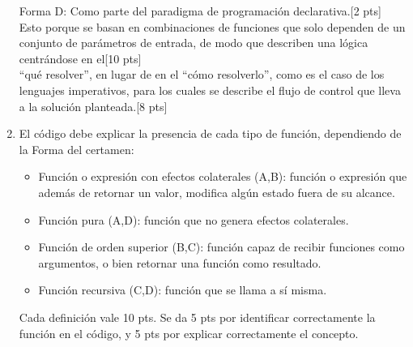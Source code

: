 \documentclass[letter,12pt,oneside]{book}
\theoremstyle{definition}
\begin{document}
\begin{enumerate}
    Forma D:
    Como parte del paradigma de programación declarativa.\tabto{82ex}[2 pts]\\
    Esto porque se basan en combinaciones de funciones que solo dependen de un conjunto de parámetros de entrada, de modo que describen una lógica centrándose en el\tabto{81ex}[10 pts]\\
    ``qué resolver'', en lugar de en el ``cómo resolverlo'', como es el caso de los lenguajes imperativos, para los cuales se describe el flujo de control que lleva a la solución planteada.\tabto{82ex}[8 pts]
    
    \item El código debe explicar la presencia de cada tipo de función, dependiendo de la Forma del certamen:
    \begin{itemize}
        \item Función o expresión con efectos colaterales (A,B): función o expresión que además de retornar un valor, modifica algún estado fuera de su alcance.
        \item Función pura (A,D): función que no genera efectos colaterales.
        \item Función de orden superior (B,C): función capaz de recibir funciones como argumentos, o bien retornar una función como resultado.
        \item Función recursiva (C,D): función que se llama a sí misma.
    \end{itemize}
    Cada definición vale 10 pts. Se da 5 pts por identificar correctamente la función en el código, y 5 pts por explicar correctamente el concepto.
\end{enumerate}
\end{document}

